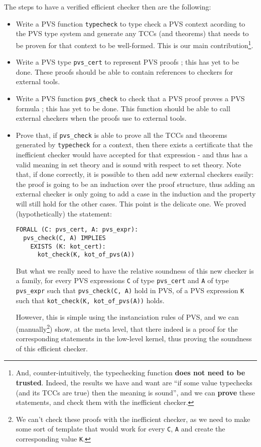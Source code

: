 \documentclass[utf8,a4paper]{article}
\begin{document}
The steps to have a verified efficient checker then are the following:
\begin{itemize}
\item Write a PVS function \verb!typecheck! to type check a PVS
  context acording to the PVS type system and generate any TCCs (and
  theorems) that needs to be proven for that context to be
  well-formed. This is our main contribution\footnote{And,
    counter-intuitively, the typechecking function \textbf{does not
      need to be trusted}. Indeed, the results we have and want are
    ``if some value typechecks (and its TCCs are true) then the
    meaning is sound'', and we can \textbf{prove} these statements,
    and check them with the inefficient checker.}.
\item Write a PVS type \verb!pvs_cert! to represent PVS proofs ; this
  has yet to be done. These proofs should be able to contain
  references to checkers for external tools.
\item Write a PVS function \verb!pvs_check! to check that a PVS proof
  proves a PVS formula ; this has yet to be done. This function should
  be able to call external checkers when the proofs use to external
  tools.
\item Prove that, if \verb!pvs_check! is able to prove all the TCCs
  and theorems generated by \verb!typecheck! for a context, then there
  exists a certificate that the inefficient checker would have
  accepted for that expression - and thus has a valid meaning in set
  theory and is sound with respect to set theory. Note that, if done
  correctly, it is possible to then add new external checkers easily:
  the proof is going to be an induction over the proof structure, thus
  adding an external checker is only going to add a case in the
  induction and the property will still hold for the other cases. This
  point is the delicate one. We proved (hypothetically) the statement:
  \begin{verbatim}
FORALL (C: pvs_cert, A: pvs_expr):
  pvs_check(C, A) IMPLIES
    EXISTS (K: kot_cert):
      kot_check(K, kot_of_pvs(A))
  \end{verbatim}
  But what we really need to have the relative soundness of this new
  checker is a family, for every PVS expressions \verb!C! of type
  \verb!pvs_cert! and \verb!A! of type \verb!pvs_expr! such that
  \verb!pvs_check(C, A)! hold in PVS, of a PVS expression \verb!K!
  such that \verb!kot_check(K, kot_of_pvs(A))! holds.

  However, this is simple using the instanciation rules of PVS, and we
  can (manually\footnote{We can't check these proofs with the
    inefficient checker, as we need to make some sort of template that
    would work for every \verb!C!, \verb!A! and create the
    corresponding value \verb!K!.}) show, at the meta level, that
  there indeed is a proof for the corresponding statements in the
  low-level kernel, thus proving the soundness of this efficient
  checker.
\end{itemize}
\end{document}
